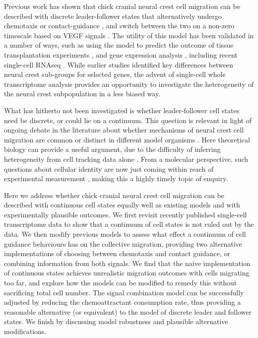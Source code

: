 \documentclass[review]{elsarticle}
\begin{document}
Previous work has shown that chick cranial neural crest cell migration can be described with discrete leader-follower states that alternatively undergo chemotaxis or contact-guidance \cite{McLennan2012,McLennan2015}, and switch between the two on a non-zero timescale based on VEGF signals \cite{McLennan2015b}. The utility of this model has been validated in a number of ways, such as using the model to predict the outcome of tissue transplantation experiments \cite{McLennan2012,McLennan2015,McLennan2015b}, and gene expression analysis \cite{McLennan2015,McLennan2015b}, including recent single-cell RNAseq \cite{Morrison2017}. While earlier studies identified key differences between neural crest sub-groups for selected genes, the advent of single-cell whole transcriptome analysis provides an opportunity to investigate the heterogeneity of the neural crest subpopulation in a less biased way. %

What has hitherto not been investigated is whether leader-follower cell states need be discrete, or could lie on a continuum. This question is relevant in light of ongoing debate in the literature about whether mechanisms of neural crest cell migration are common or distinct in different model organisms \cite{Schumacher2016a,Richardson2016,Genuth2018}. Here theoretical biology can provide a useful argument, due to the difficulty of inferring heterogeneity from cell tracking data alone \cite{Schumacher2017}. From a molecular perspective, such questions about cellular identity are now just coming within reach of experimental measurement \cite{Wagner2016}, making this a highly timely topic of enquiry. %

Here we address whether chick cranial neural crest cell migration can be described with continuous cell states equally well as existing models and with experimentally plausible outcomes. We first revisit recently published single-cell transcriptome data \cite{Morrison2017} to show that a continuum of cell states is not ruled out by the data. We then modify previous models \cite{McLennan2015,McLennan2015b} to assess what effect a continuum of cell guidance behaviours has on the collective migration, providing two alternative implementations of choosing between chemotaxis and contact guidance, or combining information from both signals. We find that the naive implementation of continuous states achieves unrealistic migration outcomes with cells migrating too far, and explore how the models can be modified to remedy this without sacrificing total cell number. The signal combination model can be successfully adjusted by reducing the chemoattractant consumption rate, thus providing a reasonable alternative (or equivalent) to the model of discrete leader and follower states. We finish by discussing model robustness and plausible alternative modifications. %
\end{document}
